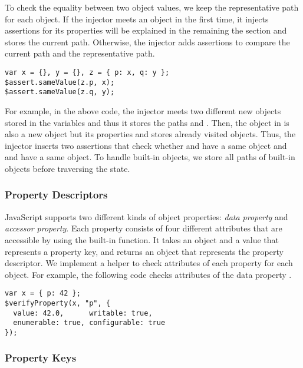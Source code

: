 To check the equality between two object values, we keep the representative path
for each object.  If the injector meets an object in the first time, it injects
assertions for its properties will be explained in the remaining the section and
stores the current path.  Otherwise, the injector adds assertions to compare the
current path and the representative path.
\begin{lstlisting}[style=myJSstyle]
var x = {}, y = {}, z = { p: x, q: y };
$assert.sameValue(z.p, x);
$assert.sameValue(z.q, y);
\end{lstlisting}
For example, in the above code, the injector meets two different new objects
stored in the variables  and  thus it stores the paths 
and .  Then, the object in  is also a new object but its
properties  and  stores already visited objects.  Thus, the
injector inserts two assertions that check whether  and  have
a same object and  and  have a same object.  To handle
built-in objects, we store all paths of built-in objects before traversing the
state.


\subsubsection{Property Descriptors}

JavaScript supports two different kinds of object properties: \textit{data
property} and \textit{accessor property}.  Each property consists of four
different attributes
that are accessible by using the
 built-in function.  It takes an object
and a value that represents a property key, and returns an object that
represents the property descriptor.  We implement a helper
 to check attributes of each property for each object.
For example, the following code checks attributes of the data property
.
\begin{lstlisting}[style=myJSstyle]
var x = { p: 42 };
$verifyProperty(x, "p", {
  value: 42.0,      writable: true,
  enumerable: true, configurable: true
});
\end{lstlisting}


\subsubsection{Property Keys}

